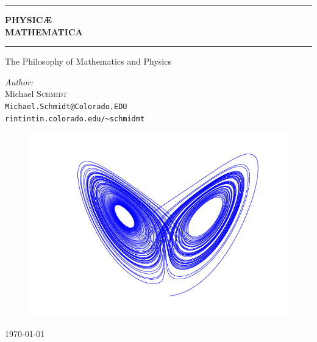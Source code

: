 \begin{titlepage}
\begin{center}
\hrule
{ \huge \bfseries PHYSIC\AE\\  MATHEMATICA}\\[0.5cm]
\hrule
The Philosophy of Mathematics and Physics

\emph{Author:}\\
Michael \textsc{Schmidt}\\
\texttt{Michael.Schmidt@Colorado.EDU}\\
\texttt{rintintin.colorado.edu/\~{}schmidmt}

\begin{figure}[!h]
	\centering
	\includegraphics[scale=0.60]{./attractor.png}
\end{figure}

\vfill
{\large \today}\\

\end{center}
\end{titlepage}
